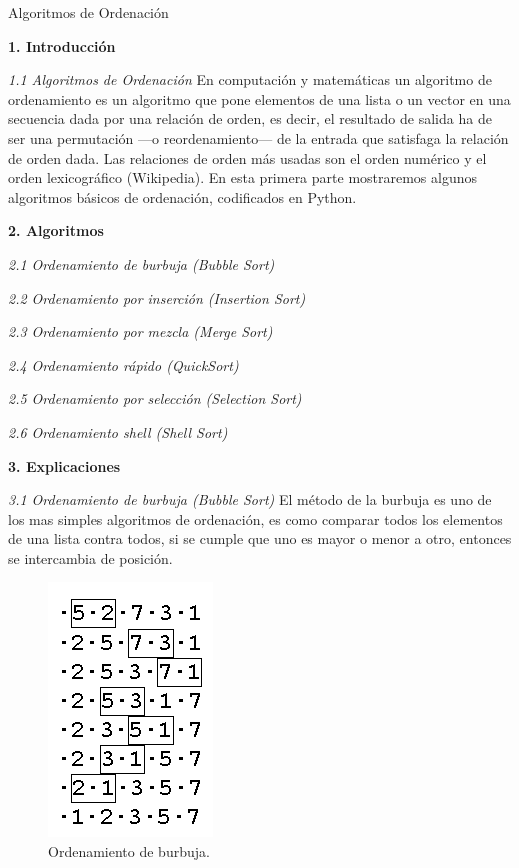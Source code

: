 \documentclass[twoside,10.5pt]{article}%
\begin{document}
\begin{center}
{\LARGE{Algoritmos de Ordenaci\'on}}\\[20pt]
\end{center}

\textbf{1. Introducci\'on}

\emph{1.1 Algoritmos de Ordenaci\'on}
En computaci\'on y matem\'aticas un {\color{blue} algoritmo de ordenamiento} es un algoritmo que pone elementos de una lista o un vector en una secuencia dada por una relaci\'on de orden, es decir, el resultado de salida ha de ser una permutaci\'on —o reordenamiento— de la entrada que satisfaga la relaci\'on de orden dada. Las relaciones de orden m\'as usadas son el orden num\'erico y el orden lexicogr\'afico (Wikipedia). En esta primera parte mostraremos algunos algoritmos b\'asicos de ordenaci\'on, codificados en Python.

\textbf{2. Algoritmos}




\emph{2.1 Ordenamiento de burbuja (Bubble Sort)}


\emph{2.2 Ordenamiento por inserci\'on (Insertion Sort) }


\emph{2.3 Ordenamiento por mezcla (Merge Sort)}

\emph{2.4 Ordenamiento r\'apido   (QuickSort)}

\emph{2.5 Ordenamiento por selecci\'on (Selection Sort)}

\emph{2.6 Ordenamiento shell  (Shell Sort)}



\textbf{3. Explicaciones}

\emph{3.1 Ordenamiento de burbuja (Bubble Sort)}
El m\'etodo de la burbuja es uno de los mas simples algoritmos de ordenaci\'on, es  como comparar todos
los elementos de una lista contra todos, si se cumple que uno es mayor o menor a
otro, entonces se  intercambia de posici\'on.

\begin{figure}[h]
  \centering
  \includegraphics[scale=.5]{burbuja.png}
  \caption{Ordenamiento de burbuja.} 
 \end{figure}
\end{document}
